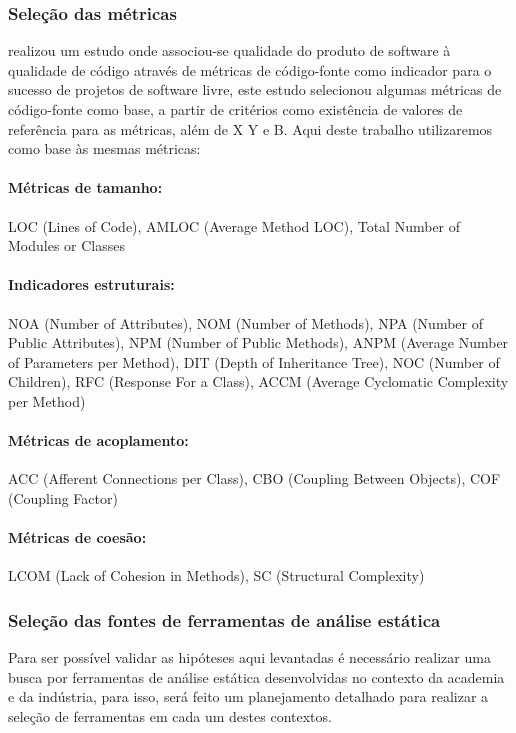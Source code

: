 \documentclass[12pt]{article}
\begin{document}
\subsubsection{Seleção das métricas}

 realizou um estudo onde associou-se
qualidade do produto de software à qualidade de código através de métricas de
código-fonte como indicador para o sucesso de projetos de software livre,
este estudo selecionou algumas métricas de código-fonte como base, a partir de
critérios como existência de valores de referência para as métricas, além de X
Y e B. Aqui deste trabalho utilizaremos como base às mesmas métricas:

\paragraph{Métricas de tamanho:}
LOC (Lines of Code), AMLOC (Average Method LOC), Total Number of Modules or Classes

\paragraph{Indicadores estruturais:}
NOA (Number of Attributes), NOM (Number of Methods), NPA (Number of Public
Attributes), NPM (Number of Public Methods), ANPM (Average Number of
Parameters per Method), DIT (Depth of Inheritance Tree), NOC (Number of
Children), RFC (Response For a Class), ACCM (Average Cyclomatic Complexity per
Method)

\paragraph{Métricas de acoplamento:}
ACC (Afferent Connections per Class), CBO (Coupling Between Objects), COF
(Coupling Factor)

\paragraph{Métricas de coesão:}
LCOM (Lack of Cohesion in Methods), SC (Structural Complexity)

\subsubsection{Seleção das fontes de ferramentas de análise estática}

Para ser possível validar as hipóteses aqui levantadas é necessário realizar
uma busca por ferramentas de análise estática desenvolvidas no contexto da
academia e da indústria, para isso, será feito um planejamento detalhado para
realizar a seleção de ferramentas em cada um destes contextos.
\end{document}
